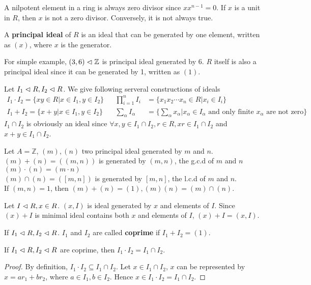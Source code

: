 \documentclass{amsart}
\begin{document}
\begin{rem}
	A nilpotent element in a ring is always zero divisor since $x x^{n-1}=0$. If $x$ is a unit in $R$, then $x$ is not a zero divisor. Conversely, it is not always true.
\end{rem}

\begin{secdefn}
	A \textbf{principal ideal} of $R$ is an ideal that can be generated by one element, written as $(x)$, where $x$ is the generator.
\end{secdefn}
For simple example, $(3,6) \vartriangleleft \mathbb{Z}$ is principal ideal generated by 6. $R$ itself is also a principal ideal since it can be generated by 1, written as $(1)$.

Let $I_1 \vartriangleleft R, I_2 \vartriangleleft R$. We give following serveral constructions of ideals
\[
\begin{aligned}
I_1 \cdot I_2 = \{ xy \in R| x \in I_1, y \in I_2\}& & \prod_{i=1}^{n} I_i &= \{ x_1 x_2 \cdots x_n \in R| x_i \in I_i\}&\\
I_1 + I_2 = \{x+y| x\in I_1, y \in I_2 \}& & \sum_{\alpha}I_\alpha &= \{\sum_{\alpha} x_\alpha | x_\alpha \in I_\alpha \text{ and only finite }x_\alpha \text{ are not zero} \}&
\end{aligned}
\]
$I_1 \cap I_2$ is obviously an ideal since $\forall x, y \in I_1 \cap I_2, r\in R, xr \in I_1 \cap I_2$ and $x+y \in I_1 \cap I_2$.

\begin{ex}
	Let $A= \mathbb{Z}$, $(m),(n)$ two principal ideal generated by $m$ and $n$.\\
	$(m)+(n) = ((m,n))$ is generated by $(m,n)$, the g.c.d of $m$ and $n$\\
	$(m)\cdot(n) = (m\cdot n)$\\
	$(m) \cap (n) =([m,n])$ is generated by $[m,n]$, the l.c.d of $m$ and $n$.\\
	If $(m,n)=1$, then $(m)+(n)=(1), (m)(n)=(m)\cap(n)$.
\end{ex}
Let $I \vartriangleleft R , x\in R$. $(x,I)$ is ideal generated by $x$ and elements of $I$. Since $(x)+I$ is minimal ideal contains both $x$ and elements of $I$, $(x)+I =(x,I)$.
\begin{secdefn}
	If $I_1 \vartriangleleft R, I_2 \vartriangleleft R$. $I_1$ and $I_2$ are called \textbf{coprime} if $I_1 + I_2 = (1)$.
\end{secdefn}

\begin{secprop}
	\label{prop1}
	If $I_1 \vartriangleleft R, I_2 \vartriangleleft R$ are coprime, then $I_1 \cdot I_2 = I_1 \cap I_2$.
\end{secprop}
\begin{proof}
	By definition, $I_1 \cdot I_2 \subseteq I_1 \cap I_2$. Let $x \in I_1 \cap I_2$, $x$ can be represented by $x=ar_1 +b r_2$, where $a \in I_1, b\in I_2$. Hence $x \in I_1 \cdot I_2= I_1 \cap I_2$.
\end{proof}
\end{document}
